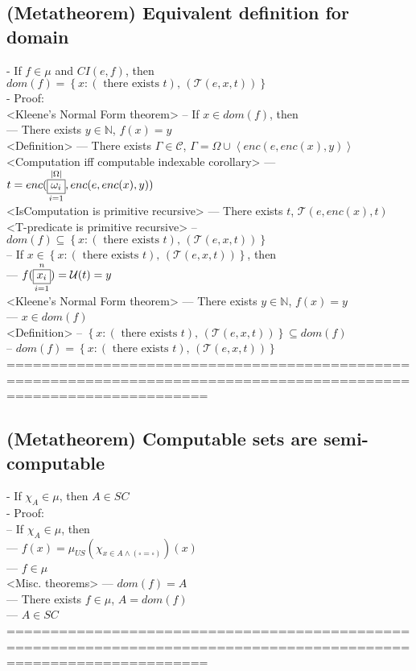 \documentclass{book}
\newcommand{\txtexists}[2]{\left(\text{ there exists }#1\right)\text{, }\left(#2\right)}
\newcommand{\placeholder}{\square}
\newcommand{\set}[1]{\left\{ #1 \right\}}
\newcommand{\seq}[1]{\left\langle #1 \right\rangle}
\newcommand{\vdc}[3]{\underset{#2}{\overset{#3}{\fbox{$#1$}}}}
\begin{document}
\subsection{(Metatheorem) Equivalent definition for domain} %
	- If $f \in \mu$ and $CI(e, f)$, then $dom(f) = \set{x: \txtexists{t}{\mathcal{T}(e, x, t)}}$ \\
	- Proof: \\ <Kleene's Normal Form theorem>
		-- If $x \in dom(f)$, then \\
			--- There exists $y \in \mathbb{N}$, $f(x) = y$ \\ <Definition>
			--- There exists $\Gamma \in \mathcal{C}$, $\Gamma = \Omega \cup \seq{enc(e, enc(x), y)}$ \\ <Computation iff computable indexable corollary>
			--- $t = enc(\vdc{\omega_i}{i=1}{|\Omega|},	enc(e, enc(x), y))$ \\ <IsComputation is primitive recursive>
			--- There exists $t$, $\mathcal{T}(e, enc(x), t)$ \\ <T-predicate is primitive recursive>
		-- $dom(f) \subseteq \set{x: \txtexists{t}{\mathcal{T}(e, x, t)}}$ \\
		-- If $x \in \set{x: \txtexists{t}{\mathcal{T}(e, x, t)}}$, then \\
			--- $f(\vdc{x_i}{i=1}{n}) = \mathcal{U}(t) = y$ \\ <Kleene's Normal Form theorem>
			--- There exists $y \in \mathbb{N}$, $f(x) = y$ \\
			--- $x \in dom(f)$ \\ <Definition>
		-- $\set{x: \txtexists{t}{\mathcal{T}(e, x, t)}} \subseteq dom(f)$ \\
		-- $dom(f) = \set{x: \txtexists{t}{\mathcal{T}(e, x, t)}}$ \\
	===================================================================================================================
\subsection{(Metatheorem) Computable sets are semi-computable} %
	- If $\chi_A \in \mu$, then $A \in SC$ \\
	- Proof: \\
		-- If $\chi_A \in \mu$, then \\
			--- $f(x) = \mu_{US}(\chi_{x \in A \land (\placeholder = \placeholder)})(x)$ \\
			--- $f \in \mu$ \\ <Misc. theorems>
			--- $dom(f) = A$ \\
			--- There exists $f \in \mu$, $A = dom(f)$ \\
			--- $A \in SC$ \\
	===================================================================================================================
\end{document}
